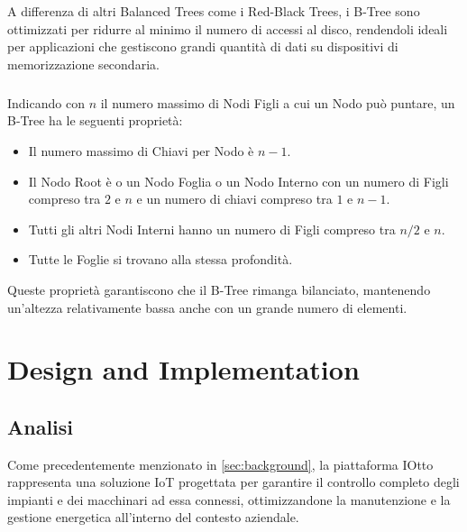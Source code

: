 \documentclass[12pt,a4paper,openright,twoside]{book}
\begin{document}
        A differenza di altri Balanced Trees come i Red-Black Trees, i B-Tree sono ottimizzati per ridurre al minimo il numero di accessi al disco, rendendoli ideali per applicazioni che gestiscono grandi quantità di dati su dispositivi di memorizzazione secondaria.

        \paragraph*{}

        Indicando con \( n \) il numero massimo di Nodi Figli a cui un Nodo può puntare, un B-Tree ha le seguenti proprietà:

        \begin{itemize}
            \item Il numero massimo di Chiavi per Nodo è \( n - 1 \).
            \item Il Nodo Root è o un Nodo Foglia o un Nodo Interno con un numero di Figli compreso tra \( 2 \) e \( n \) e un numero di chiavi compreso tra \( 1 \) e \( n - 1 \).
            \item Tutti gli altri Nodi Interni hanno un numero di Figli compreso tra \( n / 2 \) e \( n \).
            \item Tutte le Foglie si trovano alla stessa profondità.
        \end{itemize}

        Queste proprietà garantiscono che il B-Tree rimanga bilanciato, mantenendo un'altezza relativamente bassa anche con un grande numero di elementi.

\chapter{Design and Implementation}

    \section{Analisi}

        Come precedentemente menzionato in \cref{sec:background}, la piattaforma IOtto rappresenta una soluzione IoT progettata per garantire il controllo completo degli impianti e dei macchinari ad essa connessi, ottimizzandone la manutenzione e la gestione energetica all'interno del contesto aziendale.

        \paragraph*{}
\end{document}
